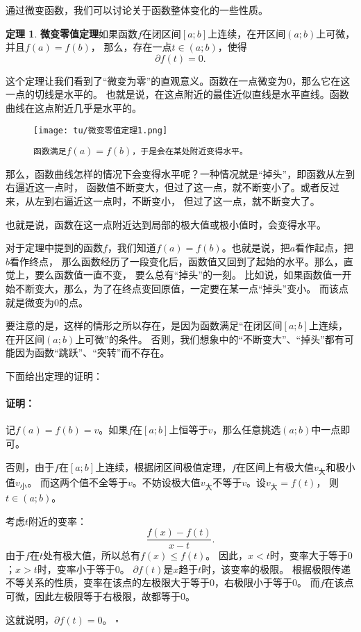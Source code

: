 \documentclass[12pt,UTF8]{ctexbook}
\theoremstyle{definition}
\newtheorem{tm}{定理}[section]
\theoremstyle{plain}
\renewenvironment{proof}{\paragraph{\textbf{证明：}}}{\hfill$\square$}
\begin{document}
通过微变函数，我们可以讨论关于函数整体变化的一些性质。

\begin{tm}{\textbf{微变零值定理}}\label{tm:2-4-0}
    如果函数$f$在闭区间$[a; b]$上连续，在开区间$(a; b)$上可微，并且$f(a) = f(b)$，
    那么，存在一点$t\in(a; b)$，使得
    $$ \partial f(t) = 0.$$
\end{tm}

这个定理让我们看到了“微变为零”的直观意义。函数在一点微变为$0$，那么它在这一点的切线是水平的。
也就是说，在这点附近的最佳近似直线是水平直线。函数曲线在这点附近几乎是水平的。

\begin{figure}[h]
    \centering
    \texttt{[image: tu/微变零值定理1.png]}    
    \caption*{\texttt{函数满足}$f(a) = f(b)$\texttt{，于是会在某处附近变得水平。}}
\end{figure}

那么，函数曲线怎样的情况下会变得水平呢？一种情况就是“掉头”，即函数从左到右逼近这一点时，
函数值不断变大，但过了这一点，就不断变小了。或者反过来，从左到右逼近这一点时，不断变小，
但过了这一点，就不断变大了。

也就是说，函数在这一点附近达到局部的极大值或极小值时，会变得水平。

对于定理中提到的函数$f$，我们知道$f(a) = f(b)$。也就是说，把$a$看作起点，把$b$看作终点，
那么函数经历了一段变化后，函数值又回到了起始的水平。那么，直觉上，要么函数值一直不变，
要么总有“掉头”的一刻。
比如说，如果函数值一开始不断变大，那么，为了在终点变回原值，一定要在某一点“掉头”变小。
而该点就是微变为$0$的点。

要注意的是，这样的情形之所以存在，是因为函数满足“在闭区间$[a; b]$上连续，在开区间$(a; b)$上可微”的条件。
否则，我们想象中的“不断变大”、“掉头”都有可能因为函数“跳跃”、“突转”而不存在。

下面给出定理的证明：
\begin{proof}
    记$f(a) = f(b) = v$。如果$f$在$[a; b]$上恒等于$v$，那么任意挑选$(a; b)$中一点即可。

    否则，由于$f$在$[a; b]$上连续，根据闭区间极值定理，$f$在区间上有极大值$v_{\text{大}}$和极小值$v_{\text{小}}$。
    而这两个值不全等于$v$。不妨设极大值$v_{\text{大}}$不等于$v$。设$v_{\text{大}} = f(t)$，
    则$t\in(a; b)$。

    考虑$t$附近的变率：
    $$ \frac{f(x) - f(t)}{x - t}. $$
    由于$f$在$t$处有极大值，所以总有$f(x) \leqslant f(t)$。
    因此，$x<t$时，变率大于等于$0$；$x>t$时，变率小于等于$0$。
    $\partial f(t)$是$x$趋于$t$时，该变率的极限。
    根据极限传递不等关系的性质，变率在该点的左极限大于等于$0$，右极限小于等于$0$。
    而$f$在该点可微，因此左极限等于右极限，故都等于$0$。
    
    这就说明，$ \partial f(t) = 0$。
\end{proof}
\end{document}
